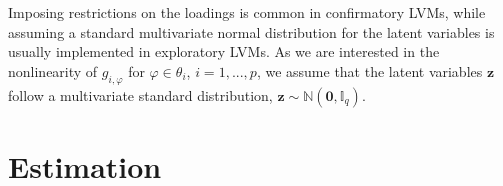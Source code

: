 \documentclass[11pt, a4paper]{article}
\begin{document}
Imposing restrictions on the loadings is common in confirmatory LVMs, while assuming a standard multivariate normal distribution for the latent variables is usually implemented in exploratory LVMs. As we are interested in the nonlinearity of $g_{i,\varphi}$ for $\varphi \in \theta_i$, $i = 1,...,p$, we assume that the latent variables $\mathbf{z}$ follow a multivariate standard distribution, $\mathbf{z} \sim \mathbb{N}(\bm{0}, \mathbb{I}_q)$. %

\section{Estimation} \label{sec:Est}
\end{document}
